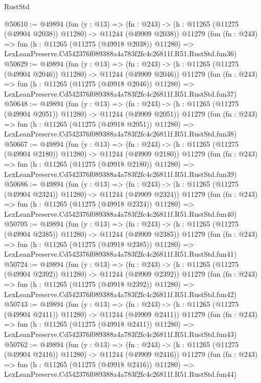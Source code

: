 \begin{lexlean}{RustStd}
\begin{coremodule}
@50610 := @49894
    (fun (y : @13) =>
    (fn : @243) -> (h : @11265 (@11275 (@49904 @2038)) @11280) -> @11244 (@49909 @2038))
    @11279
    (fun (fn : @243) =>
    fun (h : @11265 (@11275 (@49918 @2038)) @11280) =>
    LexLeanPreserve.Cd542376f089388a4a783f2fc4c26811f.R51.RustStd.fun36)
@50629 := @49894
    (fun (y : @13) =>
    (fn : @243) -> (h : @11265 (@11275 (@49904 @2046)) @11280) -> @11244 (@49909 @2046))
    @11279
    (fun (fn : @243) =>
    fun (h : @11265 (@11275 (@49918 @2046)) @11280) =>
    LexLeanPreserve.Cd542376f089388a4a783f2fc4c26811f.R51.RustStd.fun37)
@50648 := @49894
    (fun (y : @13) =>
    (fn : @243) -> (h : @11265 (@11275 (@49904 @2051)) @11280) -> @11244 (@49909 @2051))
    @11279
    (fun (fn : @243) =>
    fun (h : @11265 (@11275 (@49918 @2051)) @11280) =>
    LexLeanPreserve.Cd542376f089388a4a783f2fc4c26811f.R51.RustStd.fun38)
@50667 := @49894
    (fun (y : @13) =>
    (fn : @243) -> (h : @11265 (@11275 (@49904 @2180)) @11280) -> @11244 (@49909 @2180))
    @11279
    (fun (fn : @243) =>
    fun (h : @11265 (@11275 (@49918 @2180)) @11280) =>
    LexLeanPreserve.Cd542376f089388a4a783f2fc4c26811f.R51.RustStd.fun39)
@50686 := @49894
    (fun (y : @13) =>
    (fn : @243) -> (h : @11265 (@11275 (@49904 @2324)) @11280) -> @11244 (@49909 @2324))
    @11279
    (fun (fn : @243) =>
    fun (h : @11265 (@11275 (@49918 @2324)) @11280) =>
    LexLeanPreserve.Cd542376f089388a4a783f2fc4c26811f.R51.RustStd.fun40)
@50705 := @49894
    (fun (y : @13) =>
    (fn : @243) -> (h : @11265 (@11275 (@49904 @2385)) @11280) -> @11244 (@49909 @2385))
    @11279
    (fun (fn : @243) =>
    fun (h : @11265 (@11275 (@49918 @2385)) @11280) =>
    LexLeanPreserve.Cd542376f089388a4a783f2fc4c26811f.R51.RustStd.fun41)
@50724 := @49894
    (fun (y : @13) =>
    (fn : @243) -> (h : @11265 (@11275 (@49904 @2392)) @11280) -> @11244 (@49909 @2392))
    @11279
    (fun (fn : @243) =>
    fun (h : @11265 (@11275 (@49918 @2392)) @11280) =>
    LexLeanPreserve.Cd542376f089388a4a783f2fc4c26811f.R51.RustStd.fun42)
@50743 := @49894
    (fun (y : @13) =>
    (fn : @243) -> (h : @11265 (@11275 (@49904 @2411)) @11280) -> @11244 (@49909 @2411))
    @11279
    (fun (fn : @243) =>
    fun (h : @11265 (@11275 (@49918 @2411)) @11280) =>
    LexLeanPreserve.Cd542376f089388a4a783f2fc4c26811f.R51.RustStd.fun43)
@50762 := @49894
    (fun (y : @13) =>
    (fn : @243) -> (h : @11265 (@11275 (@49904 @2416)) @11280) -> @11244 (@49909 @2416))
    @11279
    (fun (fn : @243) =>
    fun (h : @11265 (@11275 (@49918 @2416)) @11280) =>
    LexLeanPreserve.Cd542376f089388a4a783f2fc4c26811f.R51.RustStd.fun44)

\end{coremodule}
\end{lexlean}
